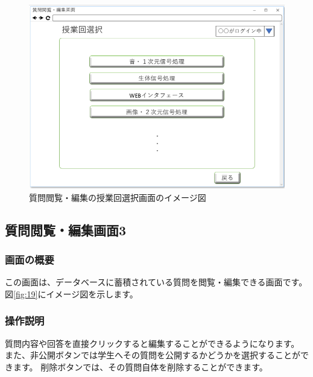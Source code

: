 \begin{figure}[htbp]
  \begin{center}
    \includegraphics[width=1\linewidth,clip]{./img/18.png}
    \caption{質問閲覧・編集の授業回選択画面のイメージ図}\label{fig:18}
  \end{center}
\end{figure}

\newpage

\subsection{質問閲覧・編集画面3}
\subsubsection{画面の概要}
この画面は、データベースに蓄積されている質問を閲覧・編集できる画面です。
図\ref{fig:19}にイメージ図を示します。

\subsubsection{操作説明}
質問内容や回答を直接クリックすると編集することができるようになります。
また、非公開ボタンでは学生へその質問を公開するかどうかを選択することができます。
削除ボタンでは、その質問自体を削除することができます。

